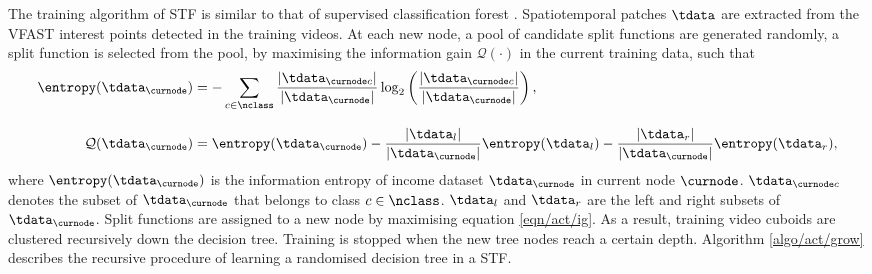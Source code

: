 The training algorithm of STF is similar to that of supervised classification forest \cite{Breiman2001}. Spatiotemporal patches $\tdata$ are extracted from the VFAST interest points detected in the training videos. 
At each new node, a pool of candidate split functions are generated randomly, a split function is selected from the pool, by maximising the information gain $\mathcal{Q}(\cdot)$ in the current training data, such that 
\begin{equation}
	\begin{aligned}
		\entropy(\tdata_{\curnode}) & = -\sum_{c \in \nclass} \frac{|\tdata_{\curnode c}|}{|\tdata_{\curnode}|}\log_{2}\left(\frac{|\tdata_{\curnode c}|}{|\tdata_{\curnode}|}\right),\\[3mm] 
		\mathcal{Q}(\tdata_{\curnode}) & = \entropy(\tdata_{\curnode}) - \frac{|\tdata_{l}|}{|\tdata_{\curnode}|}\entropy(\tdata_{l}) - \frac{|\tdata_{r}|}{|\tdata_{\curnode}|}\entropy(\tdata_{r}),
	\end{aligned}
	\label{eqn/act/ig}
\end{equation}
where $\entropy(\tdata_{\curnode})$ is the information entropy of income dataset $\tdata_{\curnode}$ in current node $\curnode$. $\tdata_{\curnode c}$ denotes the subset of $\tdata_{\curnode}$ that belongs to class $c \in \nclass$. $\tdata_{l}$ and $\tdata_{r}$ are the left and right subsets of $\tdata_{\curnode}$.
Split functions are assigned to a new node by maximising equation \ref{eqn/act/ig}. As a result, training video cuboids are clustered recursively down the decision tree. Training is stopped when the new tree nodes reach a certain depth. Algorithm \ref{algo/act/grow} describes the recursive procedure of learning a randomised decision tree in a STF.

